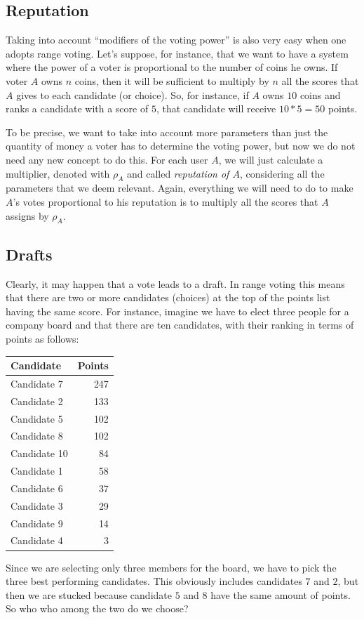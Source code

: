 \documentclass[submission, copyright,creativecommons,sharealike,noncommercial]{eptcs}
\begin{document}
\subsection{Reputation}\label{subsec:Reputation}
%
	Taking into account ``modifiers of the voting power'' is also very easy when one adopts range voting. Let's suppose, for instance, that we want to have a system where the power of a voter is proportional to the number of coins he owns. If voter $A$ owns $n$ coins, then it will be sufficient to multiply by $n$ all the scores that $A$ gives to each candidate (or choice). So, for instance, if $A$ owns $10$ coins and ranks a candidate with a score of $5$, that candidate will receive $10*5=50$ points.
	
	To be precise, we want to take into account more parameters than just the quantity of money a voter has to determine the voting power, but now we do not need any new concept to do this. For each user $A$, we will just calculate a multiplier, denoted with $\rho_A$ and called \emph{reputation of $A$}, considering all the parameters that we deem relevant. Again, everything we will need to do to make $A$'s votes proportional to his reputation is to multiply all the scores that $A$ assigns by $\rho_A$.
%
%
\subsection{Drafts}\label{subsec:Drafts}
%
	Clearly, it may happen that a vote leads to a draft. In range voting this means that there are two or more candidates (choices) at the top of the points list having the same score. For instance, imagine we have to elect three people for a company board and that there are ten candidates, with their ranking in terms of points as follows:
	\begin{center}
	\begin{tabular}{| l | r |}
		\hline
		\textbf{Candidate} & \textbf{Points}\\
		\hline			
		Candidate 7 & 247\\
		Candidate 2 & 133\\
		Candidate 5 & 102\\
		Candidate 8 & 102\\
		Candidate 10 & 84\\
		Candidate 1 & 58\\
		Candidate 6 & 37\\
		Candidate 3 & 29\\
		Candidate 9 & 14\\
		Candidate 4 & 3\\
		\hline  
	\end{tabular}
	\end{center}
%
	Since we are selecting only three members for the board, we have to pick the three best performing candidates. This obviously includes candidates $7$ and $2$, but then we are stucked because candidate $5$ and $8$ have the same amount of points. So who who among the two do we choose?
	
\end{document}
